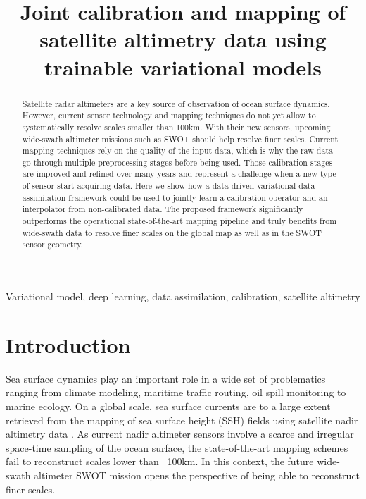 \documentclass{article}
\title{Joint calibration and mapping of satellite altimetry data using trainable variational models}
\begin{document}
%
\maketitle
%
\begin{abstract}
Satellite radar altimeters are a key source of observation of ocean surface dynamics.
However, current sensor technology and mapping techniques do not yet allow to systematically resolve scales smaller than 100km. 
With their new sensors, upcoming wide-swath altimeter missions such as SWOT should help resolve finer scales.
Current mapping techniques rely on the quality of the input data, which is why the raw data go through multiple preprocessing stages before being used. Those calibration stages are improved and refined over many years and represent a challenge when a new type of sensor start acquiring data.
Here we show how a data-driven variational data assimilation framework could be used to jointly learn a calibration operator and an interpolator from non-calibrated data.
The proposed framework significantly outperforms the operational state-of-the-art mapping pipeline and truly benefits from wide-swath data to resolve finer scales on the global map as well as in the SWOT sensor geometry.
\end{abstract}
%
\begin{keywords}
	Variational model, deep learning, data assimilation, calibration, satellite altimetry
\end{keywords}
%
\section{Introduction}

Sea surface dynamics play an important role in a wide set of problematics ranging from
climate modeling, maritime traffic routing, oil spill monitoring to marine ecology. On a global scale, sea surface currents are to a large extent retrieved from the mapping of sea surface height (SSH) fields using satellite nadir altimetry data \cite{rohrs2021}. 
As current nadir altimeter sensors involve a scarce and irregular space-time sampling of the ocean surface, the state-of-the-art mapping schemes fail to reconstruct scales lower than ~100km. In this context, the future wide-swath altimeter SWOT mission \cite{morrow2019} opens the perspective of being able to reconstruct finer scales.
\end{document}
